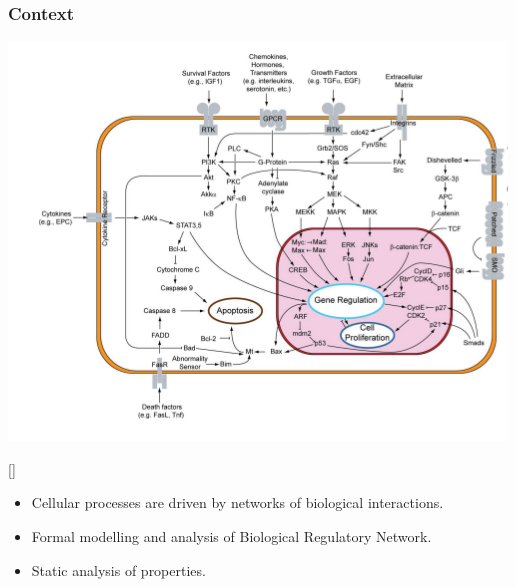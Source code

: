 \begin{frame}[c]
  \frametitle{Context}
\begin{center}
  \includegraphics[scale=0.55]{images/cellule_description_lui.png}
\end{center}
\begin{center}
{\tiny \color{darkgreen}[\citelui]}
\end{center}


\begin{itemize}
\item Cellular processes are driven by networks of biological interactions.
\item Formal modelling and analysis of Biological Regulatory Network.
\item Static analysis of properties.
\end{itemize}







\end{frame}

